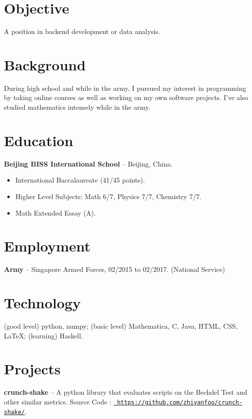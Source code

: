 \documentclass[margin]{res}
\begin{document}
\begin{resume} 
 
\section{Objective} 
A position in backend development or data analysis. 

\section{Background}
During high school and while in the army, I pursued my interest in programming
    by taking online courses as well as working on my own software projects. I've
    also studied mathematics intensely while in the army.

\section{Education} 
    {\bf Beijing BISS International School} -- Beijing, China.
\begin{itemize}
    \item International Baccalaureate (41/45 points).
    \item Higher Level Subjects: Math 6/7, Physics 7/7, Chemistry 7/7.
    \item Math Extended Essay (A).
\end{itemize}


\section{Employment}
    {\bf Army} -- Singapore Armed Forces, 02/2015 to 02/2017. (National Service)
 

\section{Technology}
    (good level) python, numpy; (basic level) Mathematica, C, Java, HTML, CSS,
    \LaTeX; (learning) Haskell.


\section{Projects}
    {\bf crunch-shake} -- A python library that evaluates scripts on
        the Bechdel Test and other similar metrics.
            Source Code : \href{https://github.com/zhiyanfoo/crunch-shake/}{\tt
            https://github.com/zhiyanfoo/crunch-shake/}.


\end{resume}
\end{document}
